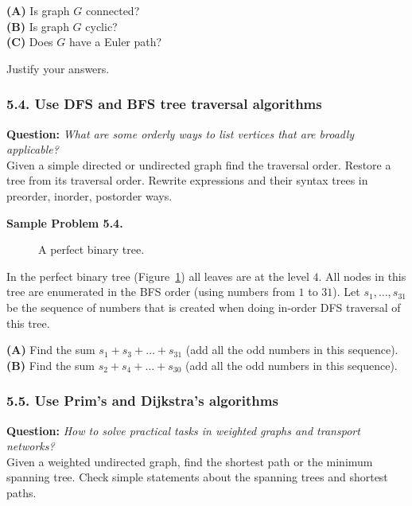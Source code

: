 \documentclass[jou]{apa6}
\begin{document}
{\bf (A)} Is graph $G$ connected?\\
{\bf (B)} Is graph $G$ cyclic?\\
{\bf (C)} Does $G$ have a Euler path?

Justify your answers.



\subsubsection{5.4. Use DFS and BFS tree traversal algorithms} 

{\bf Question:} {\em What are some orderly ways to list vertices that are broadly applicable?}\\
{\scriptsize 
Given a simple directed or undirected graph find the traversal order. 
Restore a tree from its traversal order. Rewrite expressions and their syntax trees in preorder, inorder, postorder ways.
}



\vspace{6pt}
{\bf Sample Problem 5.4.}
\begin{figure}[!htb]
\caption{\label{fig:perfect-binary-tree} A perfect binary tree.}
\end{figure}


In the perfect binary tree (Figure~\ref{fig:perfect-binary-tree}) all leaves are at the level $4$. 
All nodes in this tree are enumerated in the BFS order (using numbers from $1$ to $31$). 
Let $s_1,\ldots,s_{31}$ be the sequence of numbers that is created when doing in-order DFS traversal of this tree. 

{\bf (A)} Find the sum $s_1 + s_3 + \ldots + s_{31}$ (add all the odd numbers in this sequence).\\
{\bf (B)} Find the sum $s_2 + s_4 + \ldots + s_{30}$ (add all the odd numbers in this sequence).\\


\subsubsection{5.5. Use Prim's and Dijkstra's algorithms}

{\bf Question:} {\em How to solve practical tasks in weighted graphs and transport networks?}\\
{\scriptsize 
Given a weighted undirected graph, find the shortest path or the minimum spanning tree. 
Check simple statements about the spanning trees and shortest paths. 
}
\end{document}
